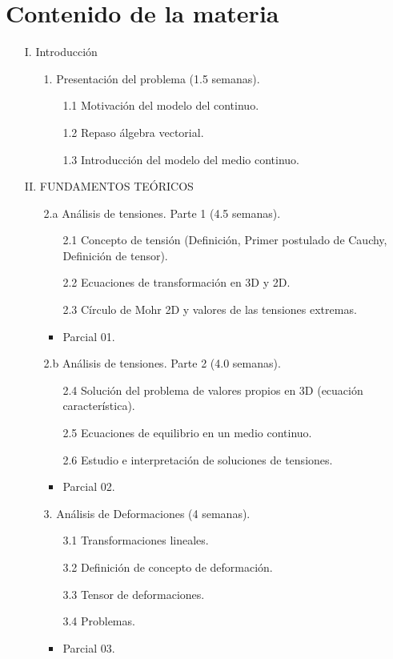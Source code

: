 \section*{Contenido de la materia}
\begin{itemize}
	\item[I.] Introducción
	\begin{itemize}
		\item[1.] Presentación del problema (1.5 semanas).
		\begin{itemize}
			\item[1.1] Motivación del modelo del continuo.
			\item[1.2] Repaso álgebra vectorial.	
			\item[1.3] Introducción del modelo del medio continuo.	
		\end{itemize}
	\end{itemize}

	\item[II.] FUNDAMENTOS TEÓRICOS
	\begin{itemize}
		\item[2.a] Análisis de tensiones. Parte 1 (4.5 semanas).
		\begin{itemize}
			\item[2.1] Concepto de tensión (Definición, Primer postulado de Cauchy, Definición de tensor).			
			\item[2.2] Ecuaciones de transformación en 3D y 2D.
			\item[2.3] Círculo de Mohr 2D y valores de las tensiones extremas.
			\item Parcial 01.
		\end{itemize}			

		\item[2.b] Análisis de tensiones. Parte 2 (4.0 semanas).
		\begin{itemize}			
			\item[2.4] Solución del problema de valores propios en 3D (ecuación característica).
			\item[2.5] Ecuaciones de equilibrio en un medio continuo.
			\item[2.6] Estudio e interpretación de soluciones de tensiones.
			\item Parcial 02.
		\end{itemize}
		
		\item[3.] Análisis de Deformaciones (4 semanas).
		\begin{itemize}
			\item[3.1] Transformaciones lineales.
			\item[3.2] Definición de concepto de deformación.
			\item[3.3] Tensor de deformaciones.
			\item[3.4] Problemas.
			\item Parcial 03.
		\end{itemize}
		

\end{itemize}
\end{itemize}
